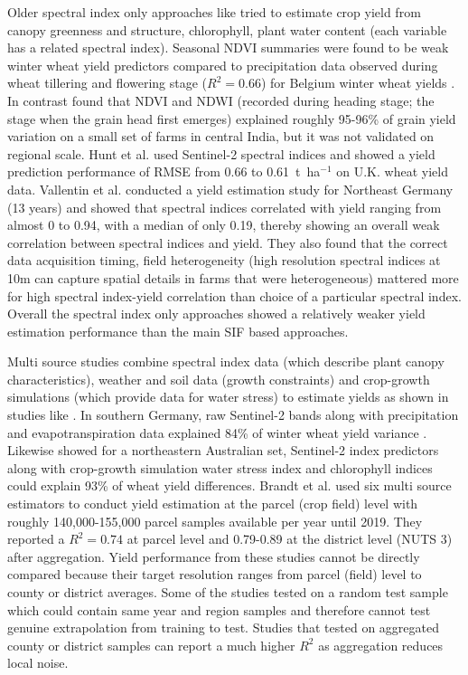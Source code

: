 Older spectral index only approaches like \cite{vannoppen2021estimating} \cite{chandel2019yield} \cite{hunt2019high} \cite{vallentin2022suitability} tried to estimate crop yield from canopy greenness and structure, chlorophyll, plant water content (each variable has a related spectral index). Seasonal NDVI summaries were found to be weak winter wheat yield predictors compared to precipitation data observed during wheat tillering and flowering stage ($R^2=0.66$) for Belgium winter wheat yields \cite{vannoppen2021estimating}. In contrast \cite{chandel2019yield} found that NDVI and NDWI (recorded during heading stage; the stage when the grain head first emerges) explained roughly 95-96\% of grain yield variation on a small set of farms in central India, but it was not validated on regional scale. Hunt et al. \cite{hunt2019high} used Sentinel-2 spectral indices and showed a yield prediction performance of RMSE from 0.66 to 0.61~t~ha$^{-1}$ on U.K. wheat yield data. Vallentin et al. \cite{vallentin2022suitability} conducted a yield estimation study for Northeast Germany (13 years) and showed that spectral indices correlated with yield ranging from almost 0 to 0.94, with a median of only 0.19, thereby showing an overall weak correlation between spectral indices and yield. They also found that the correct data acquisition timing, field heterogeneity (high resolution spectral indices at 10m can capture spatial details in farms that were heterogeneous) mattered more for high spectral index-yield correlation than choice of a particular spectral index. Overall the spectral index only approaches showed a relatively weaker yield estimation performance than the main SIF based approaches. 

Multi source studies combine spectral index data (which describe plant canopy characteristics), weather and soil data (growth constraints) and crop-growth simulations (which provide data for water stress) to estimate yields as shown in studies like \cite{goihl2024crop} \cite{marszalek2022prediction} \cite{brandt2024ensemble} \cite{zhao2020predicting} \cite{srivastava2022winter}. In southern Germany, raw Sentinel-2 bands along with precipitation and evapotranspiration data explained 84\% of winter wheat yield variance \cite{marszalek2022prediction}. Likewise \cite{zhao2020predicting} showed for a northeastern Australian set, Sentinel-2 index predictors along with crop-growth simulation water stress index and chlorophyll indices could explain 93\% of wheat yield differences. Brandt et al. used six multi source estimators to conduct yield estimation at the parcel (crop field) level with roughly 140,000-155,000 parcel samples available per year until 2019. They reported a $R^2=0.74$ at parcel level and 0.79-0.89 at the district level (NUTS 3) after aggregation. Yield performance from these studies cannot be directly compared because their target resolution ranges from parcel (field) level to county or district averages. Some of the studies tested on a random test sample which could contain same year and region samples and therefore cannot test genuine extrapolation from training to test. Studies that tested on aggregated county or district samples can report a much higher $R^2$ as aggregation reduces local noise. 

